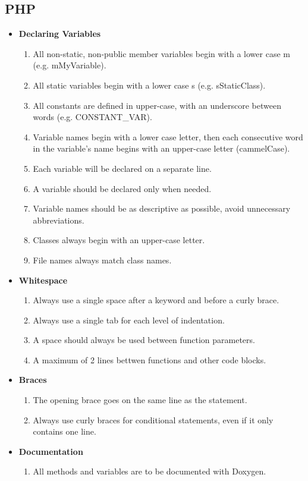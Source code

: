 \documentclass[11pt,a4paper]{article}
\begin{document}
\subsection{PHP}
\begin{itemize}
\item \textbf{Declaring Variables}
	\begin{enumerate}
	\item All non-static, non-public member variables begin with a lower case m (e.g. mMyVariable).
	\item All static variables begin with a lower case s (e.g. sStaticClass).
    \item All constants are defined in upper-case, with an underscore between words (e.g. CONSTANT\_VAR).
	\item Variable names begin with a lower case letter, then each consecutive word in the variable's name begins with an upper-case letter (cammelCase).
	\item Each variable will be declared on a separate line.
	\item A variable should be declared only when needed.
	\item Variable names should be as descriptive as possible, avoid unnecessary abbreviations.
	\item Classes always begin with an upper-case letter.
	\item File names always match class names.
	\end{enumerate}
\item \textbf{Whitespace}
	\begin{enumerate}
	\item Always use a single space after a keyword and before a curly brace.
    \item Always use a single tab for each level of indentation.
    \item A space should always be used between function parameters.
    \item A maximum of 2 lines bettwen functions and other code blocks.
	\end{enumerate}
\item \textbf{Braces}
	\begin{enumerate}
	\item The opening brace goes on the same line as the statement.
	\item Always use curly braces for conditional statements, even if it only contains one line.
	\end{enumerate}
\item \textbf{Documentation}
	\begin{enumerate}
	\item All methods and variables are to be documented with Doxygen.
	\end{enumerate}
\end{itemize}
\end{document}
